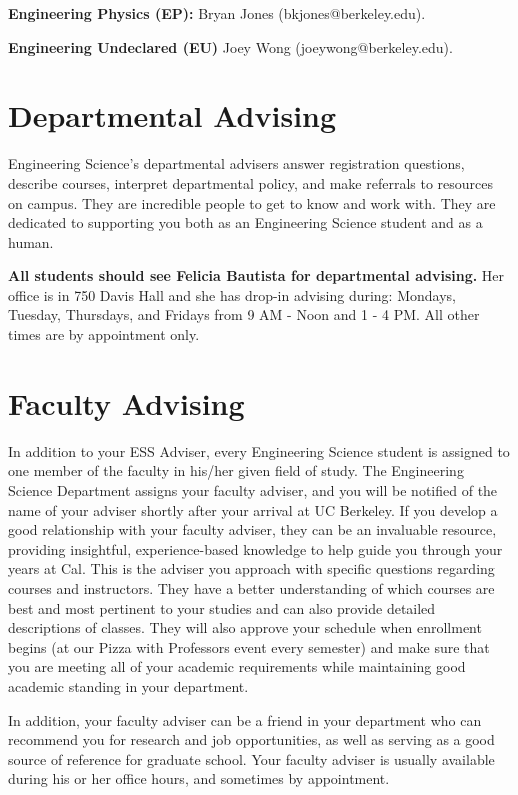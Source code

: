 \textbf{Engineering Physics (EP):} Bryan Jones ({\selectfont bkjones@berkeley.edu}).

\textbf{Engineering Undeclared (EU)} Joey Wong ({\selectfont joeywong@berkeley.edu}).

\section*{Departmental Advising}

Engineering Science’s departmental advisers answer registration questions, describe courses, interpret departmental policy, and make referrals to resources on campus. They are incredible people to get to know and work with. They are dedicated to supporting you both as an Engineering Science student and as a human.

\textbf{All students should see Felicia Bautista for departmental advising.} Her office is in 750 Davis Hall and she has drop-in advising during: Mondays, Tuesday, Thursdays, and Fridays from 9 AM - Noon and 1 - 4 PM. All other times are by appointment only.


\section*{Faculty Advising}

In addition to your ESS Adviser, every Engineering Science student is assigned to one member of the faculty in his/her given field of study.
The Engineering Science Department assigns your faculty adviser, and you will be notified of the name of your adviser shortly after your arrival at UC Berkeley. If you develop a good relationship with your faculty adviser, they can be an invaluable resource, providing insightful, experience-based knowledge to help guide you through your years at Cal. This is the adviser you approach with specific questions regarding courses and instructors. They have a better understanding of which courses are best and most pertinent to your studies and can also provide detailed descriptions of classes. They will also approve your schedule when enrollment begins (at our Pizza with Professors event every semester) and make sure that you are meeting all of your academic requirements while maintaining good academic standing in your department.

In addition, your faculty adviser can be a friend in your department who can recommend you for research and job opportunities, as well as serving as a good source of reference for graduate school. Your faculty adviser is usually available during his or her office hours, and sometimes by appointment.

